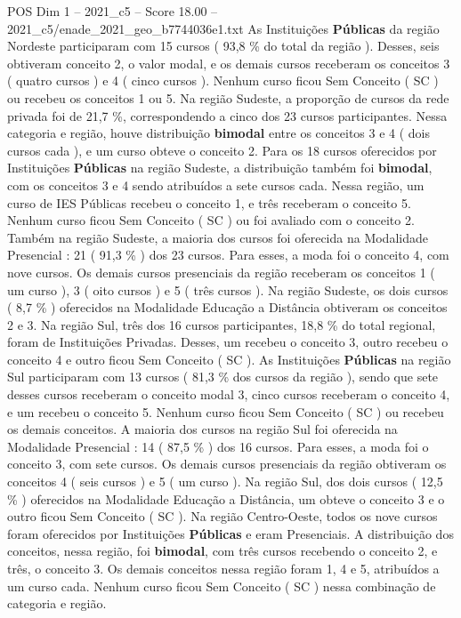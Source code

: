 \begin{textsample}{POS Dim 1 – 2021\_c5 – Score 18.00 – 2021\_c5/enade\_2021\_geo\_b7744036e1.txt}
As Instituições \textbf{Públicas} da região Nordeste participaram com 15 cursos ( 93,8 \% do total da região ).
Desses, seis obtiveram conceito 2, o valor modal, e os demais cursos receberam os conceitos 3 ( quatro cursos ) e 4 ( cinco cursos ).
Nenhum curso ficou Sem Conceito ( SC ) ou recebeu os conceitos 1 ou 5.
Na região Sudeste, a proporção de cursos da rede privada foi de 21,7 \%, correspondendo a cinco dos 23 cursos participantes.
Nessa categoria e região, houve distribuição \textbf{bimodal} entre os conceitos 3 e 4 ( dois cursos cada ), e um curso obteve o conceito 2.
Para os 18 cursos oferecidos por Instituições \textbf{Públicas} na região Sudeste, a distribuição também foi \textbf{bimodal}, com os conceitos 3 e 4 sendo atribuídos a sete cursos cada.
Nessa região, um curso de IES Públicas recebeu o conceito 1, e três receberam o conceito 5.
Nenhum curso ficou Sem Conceito ( SC ) ou foi avaliado com o conceito 2.
Também na região Sudeste, a maioria dos cursos foi oferecida na Modalidade Presencial : 21 ( 91,3 \% ) dos 23 cursos.
Para esses, a moda foi o conceito 4, com nove cursos.
Os demais cursos presenciais da região receberam os conceitos 1 ( um curso ), 3 ( oito cursos ) e 5 ( três cursos ).
Na região Sudeste, os dois cursos ( 8,7 \% ) oferecidos na Modalidade Educação a Distância obtiveram os conceitos 2 e 3.
Na região Sul, três dos 16 cursos participantes, 18,8 \% do total regional, foram de Instituições Privadas.
Desses, um recebeu o conceito 3, outro recebeu o conceito 4 e outro ficou Sem Conceito ( SC ).
As Instituições \textbf{Públicas} na região Sul participaram com 13 cursos ( 81,3 \% dos cursos da região ), sendo que sete desses cursos receberam o conceito modal 3, cinco cursos receberam o conceito 4, e um recebeu o conceito 5.
Nenhum curso ficou Sem Conceito ( SC ) ou recebeu os demais conceitos.
A maioria dos cursos na região Sul foi oferecida na Modalidade Presencial : 14 ( 87,5 \% ) dos 16 cursos.
Para esses, a moda foi o conceito 3, com sete cursos.
Os demais cursos presenciais da região obtiveram os conceitos 4 ( seis cursos ) e 5 ( um curso ).
Na região Sul, dos dois cursos ( 12,5 \% ) oferecidos na Modalidade Educação a Distância, um obteve o conceito 3 e o outro ficou Sem Conceito ( SC ).
Na região Centro-Oeste, todos os nove cursos foram oferecidos por Instituições \textbf{Públicas} e eram Presenciais.
A distribuição dos conceitos, nessa região, foi \textbf{bimodal}, com três cursos recebendo o conceito 2, e três, o conceito 3.
Os demais conceitos nessa região foram 1, 4 e 5, atribuídos a um curso cada.
Nenhum curso ficou Sem Conceito ( SC ) nessa combinação de categoria e região.

\end{textsample}
